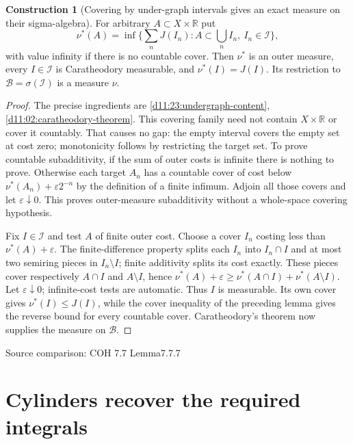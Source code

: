\documentclass[11pt,oneside,openany]{book}
\theoremstyle{definition}
\newtheorem{construction}[theorem]{Construction}
\theoremstyle{remark}
\newcommand{\R}{\mathbb R}\newcommand{\C}{\mathbb C}
\newcommand{\eps}{\varepsilon}\newcommand{\ee}{\varepsilon}
\newcommand{\family}[1]{}
\newcommand{\source}[1]{\par\begingroup\small\sffamily\color{black!65}Source comparison: #1\par\endgroup}
\begin{document}
\begin{construction}[Covering by under-graph intervals gives an exact measure on their sigma-algebra]\family{D11.23.undergraph_outer_measure}\label{d11:23:undergraph-outer-measure}
For arbitrary $A\subset X\times\R$ put
\[\nu^*(A)=\inf\{\sum_nJ(I_n):A\subset\bigcup_nI_n,\ I_n\in\mathcal I\},\]
with value infinity if there is no countable cover. Then $\nu^*$ is an outer measure, every $I\in\mathcal I$ is Caratheodory measurable, and $\nu^*(I)=J(I)$. Its restriction to $\mathcal B=\sigma(\mathcal I)$ is a measure $\nu$.
\end{construction}
\begin{proof}
The precise ingredients are \cref{d11:23:undergraph-content}, \cref{d11:02:caratheodory-theorem}. This covering family need not contain $X\times\R$ or cover it countably. That causes no gap: the empty interval covers the empty set at cost zero; monotonicity follows by restricting the target set. To prove countable subadditivity, if the sum of outer costs is infinite there is nothing to prove. Otherwise each target $A_n$ has a countable cover of cost below $\nu^*(A_n)+\eps2^{-n}$ by the definition of a finite infimum. Adjoin all those covers and let $\eps\downarrow0$. This proves outer-measure subadditivity without a whole-space covering hypothesis.

Fix $I\in\mathcal I$ and test $A$ of finite outer cost. Choose a cover $I_n$ costing less than $\nu^*(A)+\eps$. The finite-difference property splits each $I_n$ into $I_n\cap I$ and at most two semiring pieces in $I_n\setminus I$; finite additivity splits its cost exactly. These pieces cover respectively $A\cap I$ and $A\setminus I$, hence
$\nu^*(A)+\eps\ge\nu^*(A\cap I)+\nu^*(A\setminus I)$.
Let $\eps\downarrow0$; infinite-cost tests are automatic. Thus $I$ is measurable. Its own cover gives $\nu^*(I)\le J(I)$, while the cover inequality of the preceding lemma gives the reverse bound for every countable cover. Caratheodory's theorem now supplies the measure on $\mathcal B$.
\end{proof}
\source{COH 7.7 Lemma7.7.7}

\section{Cylinders recover the required integrals}
\end{document}
